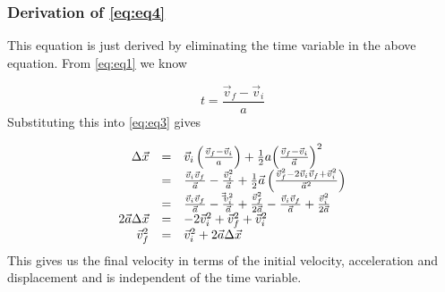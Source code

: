             \subsubsection*{Derivation of  \ref{eq:eq4}}
            \nopagebreak
          \label{m38796*id77086}This equation is just derived by eliminating the time variable in the above equation. From   \ref{eq:eq1} we know\par 
          \label{m38796*id77095}\nopagebreak\noindent{}
            
    \begin{equation*}
    t=\frac{\vec{v}_{f}-\vec{v}_{i}}{a}
      \end{equation*}
          \label{m38796*id77132}Substituting this into  \ref{eq:eq3} gives\par 
            
    \begin{equation*}
    \begin{array}{ccc}
\hfill \Delta \vec{x}& =& \vec{v}_{i}\left(\frac{\vec{v}_{f}-\vec{v}_{i}}{a}\right)+\frac{1}{2}a{\left(\frac{\vec{v}_{f}-\vec{v}_{i}}{\vec{a}}\right)}^{2}\hfill \\ 
& =& \frac{\vec{v}_{i}\vec{v}_{f}}{\vec{a}} - \frac{\vec{v}_{i}^{2}}{\vec{a}}+\frac{1}{2}\vec{a}\left(\frac{\vec{v}_{f}^{2}-2\vec{v}_{i}\vec{v}_{f}+\vec{v}_{i}^{2}}{\vec{a}^{2}}\right)\hfill \\ 
& =& \frac{\vec{v}_{i}\vec{v}_{f}}{\vec{a}}-\frac{\vec\vec{v}_{i}^{2}}{\vec{a}}+\frac{\vec{v}_{f}^{2}}{2\vec{a}}-\frac{\vec{v}_{i}\vec{v}_{f}}{\vec{a}}+\frac{\vec{v}_{i}^{2}}{2\vec{a}}\hfill \\
 \hfill 2\vec{a}\Delta \vec{x}& =& -2\vec{v}_{i}^{2}+\vec{v}_{f}^{2}+\vec{v}_{i}^{2}\hfill \\ \hfill \vec{v}_{f}^{2}& =& \vec{v}_{i}^{2}+2\vec{a}\Delta \vec{x}\hfill
 \end{array}
      \end{equation*}
          \label{m38796*id77586}This gives us the final velocity in terms of the initial velocity, acceleration and displacement and is independent of the time variable.\par 
\label{m38796*secfhsst!!!underscore!!!id4852}
      \noindent
